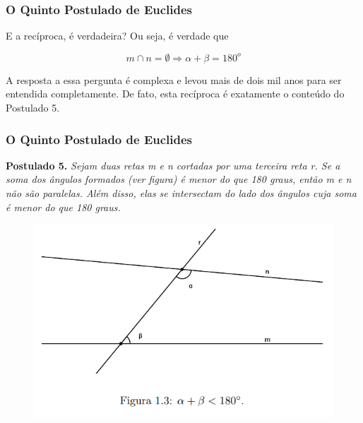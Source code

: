 \begin{frame}
    \frametitle{O Quinto Postulado de Euclides}
    \justifying
    E a recíproca, é verdadeira? Ou seja, é verdade que

    \begin{equation}
        m \cap n = \emptyset \Rightarrow \alpha + \beta = 180^o
    \end{equation}

    A resposta a essa pergunta é complexa e levou mais de dois mil anos para ser entendida completamente. De fato, esta recíproca é exatamente o conteúdo do Postulado 5.

\end{frame}

\begin{frame}
    \frametitle{O Quinto Postulado de Euclides}
    \justifying
    \textbf{Postulado 5.} \textit{Sejam duas retas m e n cortadas por uma terceira reta r. Se a soma dos ângulos formados (ver figura) é menor do que 180 graus, então m e n não são paralelas. Além disso, elas se intersectam do lado dos ângulos cuja soma é menor do que 180 graus.}

    \begin{figure}[h!]
        \centering
        \includegraphics[scale=0.55]{img/postulado5.png}
    \end{figure}

\end{frame}

